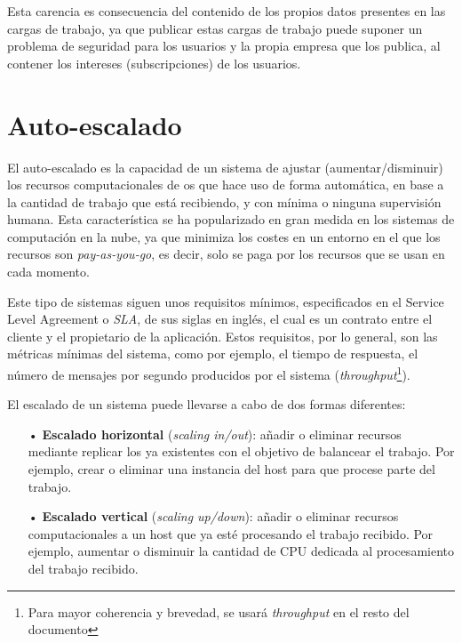Esta carencia es consecuencia del contenido de los propios datos presentes en las cargas de trabajo,
ya que publicar estas cargas de trabajo puede suponer un problema de seguridad para los usuarios y la
propia empresa que los publica, al contener los intereses (subscripciones) de los
usuarios\cite{paper:lackpublicworkloads}\cite{paper:autoscaling-review}\cite{paper:padres}.




\section{Auto-escalado} \label{sct:art_auto-escaling}

El auto-escalado es la capacidad de un sistema de ajustar (aumentar/disminuir) los recursos computacionales
de os que hace uso de forma automática, en base a la cantidad de trabajo que está recibiendo, y con mínima
o ninguna supervisión humana. Esta característica se ha popularizado en gran medida en los sistemas de
computación en la nube, ya que minimiza los costes en un entorno en el que los recursos son 
\textit{pay-as-you-go}, es decir, solo se paga por los recursos que se usan en cada momento.

Este tipo de sistemas siguen unos requisitos mínimos, especificados en el 
Service Level Agreement o \textit{SLA}, de sus siglas en inglés, el cual es un contrato entre 
el cliente y el propietario de la aplicación. Estos requisitos, por lo general, son las métricas mínimas
del sistema, como por ejemplo, el tiempo de respuesta, el número de mensajes por segundo producidos 
por el sistema (\textit{throughput}\footnote{Para mayor coherencia y brevedad, se usará \textit{throughput} en el resto del documento}).

El escalado de un sistema puede llevarse a cabo de dos formas diferentes\cite{paper:autoscaling-review}:
\begin{itemize}

    \item[•] \textbf{Escalado horizontal} (\textit{scaling in/out}): añadir o eliminar recursos 
    mediante replicar los ya existentes con el objetivo de balancear el trabajo. Por ejemplo, crear 
    o eliminar una instancia del host para que procese parte del trabajo.

    \item[•] \textbf{Escalado vertical} (\textit{scaling up/down}): añadir o eliminar recursos
    computacionales a un host que ya esté procesando el trabajo recibido. Por ejemplo, aumentar o 
    disminuir la cantidad de CPU dedicada al procesamiento del trabajo recibido.

\end{itemize}

